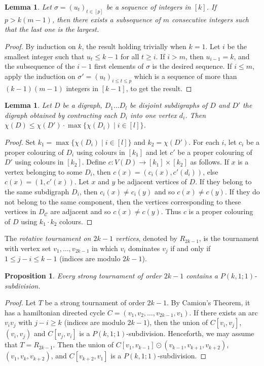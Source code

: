 \documentclass[utf8,10pt]{article}
\theoremstyle{plain}
\newtheorem{lemma}[theorem]{Lemma}
\newtheorem{proposition}[theorem]{Proposition}
\theoremstyle{definition}
\theoremstyle{remark}
\begin{document}
\begin{lemma}\label{max}
Let $\sigma=(u_t)_{t\in [p]}$ be a sequence of integers in $[k]$. 
If $p > k (m-1)$, then there exists a subsequence of $m$ consecutive integers such that the
last one is the largest.
\end{lemma}

\begin{proof}
By induction on $k$, the result holding trivially when $k=1$. 
Let $i$ be the smallest integer such that $u_t\leq k-1$ for all $t\geq i$.
If $i>m$, then $u_{i-1}=k$, and the subsequence of the $i-1$ first elements of $\sigma$ is the desired sequence.
If $i\leq m$, apply the induction on $\sigma'=(u_t)_{i\leq t\leq p}$ which is a sequence of more than $(k-1)(m-1)$ integers in $[k-1]$, to get the result. 
\end{proof}

\begin{lemma}\label{lem:contrac}
Let $D$ be a digraph, $D_1 \dots D_l$ be disjoint subdigraphs of $D$ and $D'$ the digraph obtained by contracting each $D_i$ into
one vertex $d_i$. Then $\chi(D) \leq \chi(D')\cdot \max\{\chi(D_i) \mid i \in [l]\}$.
\end{lemma}

\begin{proof}

Set $k_1 = \max\{\chi(D_i) \mid i \in [l]\}$ and $k_2 = \chi(D')$. For each $i$, let $c_i$ be a proper colouring of $D_i$ using colours in $[k_1]$ and let
$c'$ be a proper colouring of $D'$ using colours in $[k_2]$. 
Define $c : V(D) \rightarrow [k_1] \times [k_2]$ as follows. If $x$ is a vertex belonging to some $D_i$, then $c(x) = (c_i(x), c'(d_i))$, else $c(x) =(1,c'(x))$. 
Let $x$ and $y$ be adjacent vertices of $D$. If they belong to the same subdigraph $D_i$, then $c_i(x) \not = c_i(y)$ and so $c(x) \not = c(y)$. If they do not belong
to the same component, then the vertices corresponding to these vertices in $D_{\mathcal{C}}$ are adjacent and so $c(x) \not = c(y)$. 
Thus $c$ is a proper colouring of $D$ using $k_1\cdot k_2$ colours. 
\end{proof}



The {\it rotative tournament on $2k-1$ vertices}, denoted by $R_{2k-1}$, is the tournament with vertex set $v_1, \dots , v_{2k-1}$ in which $v_i$ dominates $v_j$ if and only if $1\leq j-i \leq k-1$ (indices are modulo $2k-1$).


\begin{proposition}\label{prop:tournoi}
Every strong tournament of order $2k-1$ contains a $P(k,1;1)$-subdivision.
\end{proposition}
\begin{proof}
Let $T$ be a strong tournament of order $2k-1$. By Camion's Theorem, it has a hamiltonian directed cycle $C=(v_1,v_2, \dots ,v_{2k-1},v_1)$.
If there exists an arc $v_iv_j$ with $j-i\geq k$  (indices are modulo $2k-1$), then the union of  $C[v_i,v_j]$, $(v_i,v_j)$ and $C[v_j,v_i]$ is a $P(k,1;1)$-subdivision.
Henceforth, we may assume that $T=R_{2k-1}$.
Then the union of $C[v_1, v_{k-1}] \odot (v_{k-1}, v_{k+1}, v_{k+2})$,  $(v_1, v_{k}, v_{k+2})$, and $C[v_{k+2}, v_1]$ is a $P(k,1;1)$-subdivision.
\end{proof}
\end{document}
